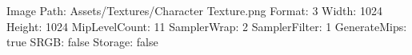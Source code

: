 Image Path: Assets/Textures/Character Texture.png
Format: 3
Width: 1024
Height: 1024
MipLevelCount: 11
SamplerWrap: 2
SamplerFilter: 1
GenerateMips: true
SRGB: false
Storage: false